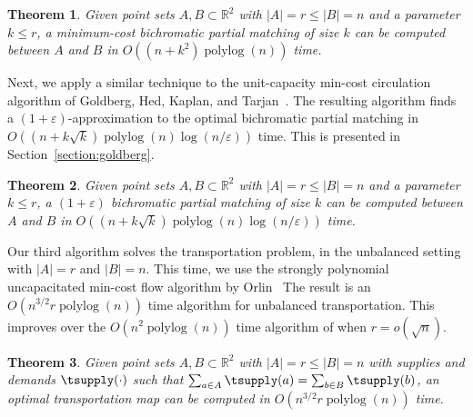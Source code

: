\documentclass[11pt]{article}
\def\polylog{\mathop{\mathrm{polylog}}}
\def\eps{\varepsilon}
\theoremstyle{plain}
\newtheorem{theorem}{Theorem}
\begin{document}
\begin{theorem}
\label{theorem:hung}
Given point sets $A, B \subset \mathbb{R}^2$ with $|A| = r \leq |B| = n$ and a 
parameter $k \leq r$, a minimum-cost bichromatic partial matching of size $k$ 
can be computed between $A$ and $B$ in $O((n + k^2)\polylog(n))$ time.
\end{theorem}


Next, we apply a similar technique to the unit-capacity min-cost circulation 
algorithm of Goldberg, Hed, Kaplan, and 
Tarjan~\cite{DBLP:journals/mst/GoldbergHKT17}. 
The resulting algorithm finds a $(1 + \eps)$-approximation to the optimal 
bichromatic partial matching in $O((n + k\sqrt{k})\polylog(n)\log(n/\eps))$ 
time.
This is presented in Section~\ref{section:goldberg}.

\begin{theorem}
\label{theorem:gmcm}
Given point sets $A, B \subset \mathbb{R}^2$ with $|A| = r \leq |B| = n$ and a 
parameter $k \leq r$, a $(1+\eps)$ bichromatic partial matching of size $k$ 
can be computed between $A$ and $B$ in 
$O((n + k\sqrt{k})\polylog(n)\log(n/\eps))$ time.
\end{theorem}


Our third algorithm solves the transportation problem, in the unbalanced 
setting with $|A| = r$ and $|B| = n$.
This time, we use the strongly polynomial uncapacitated min-cost flow algorithm
by Orlin~%
The result is an $O(n^{3/2}r\polylog(n))$ time algorithm for unbalanced 
transportation.
This improves over the $O(n^2 \polylog(n))$ time algorithm of %
when $r = o(\sqrt{n})$.

\begin{theorem}
\label{theorem:orlin}
Given point sets $A, B \subset \mathbb{R}^2$ with $|A| = r \leq |B| = n$ with
supplies and demands $\tsupply(\cdot)$ such that 
$\sum_{a \in A} \tsupply(a) = \sum_{b \in B} \tsupply(b)$, an optimal 
transportation map can be computed in $O(n^{3/2}r\polylog(n))$ time.
\end{theorem}


\end{document}
